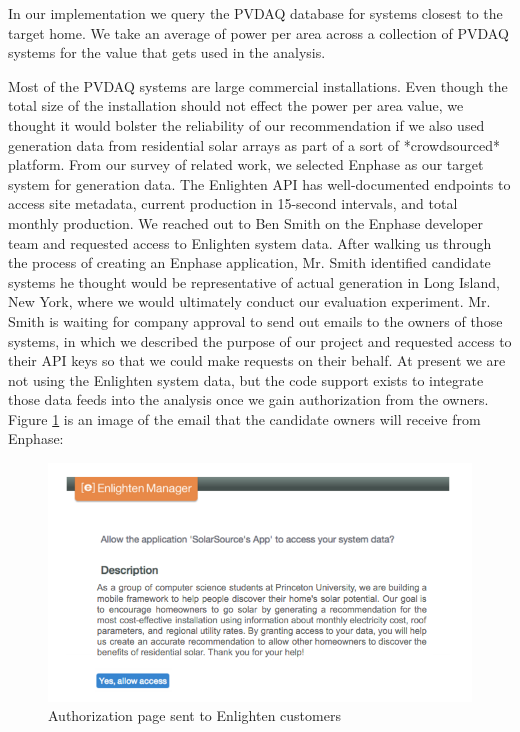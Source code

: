 \documentclass[pageno]{jpaper}
\begin{document}
In our implementation we query the PVDAQ database for systems closest to the target home. We take an average of power per area across a collection of PVDAQ systems for the value that gets used in the analysis.

Most of the PVDAQ systems are large commercial installations. Even though the total size of the installation should not effect the power per area value, we thought it would bolster the reliability of our recommendation if we also used generation data from residential solar arrays as part of a sort of *crowdsourced* platform. From our survey of related work, we selected Enphase as our target system for generation data. The Enlighten API has well-documented endpoints to access site metadata, current production in 15-second intervals, and total monthly production. We reached out to Ben Smith on the Enphase developer team and requested access to Enlighten system data. After walking us through the process of creating an Enphase application, Mr. Smith identified candidate systems he thought would be representative of actual generation in Long Island, New York, where we would ultimately conduct our evaluation experiment. Mr. Smith is waiting for company approval to send out emails to the owners of those systems, in which we described the purpose of our project and requested access to their API keys so that we could make requests on their behalf. At present we are not using the Enlighten system data, but the code support exists to integrate those data feeds into the analysis once we gain authorization from the owners. Figure \ref{fig:enphase} is an image of the email that the candidate owners will receive from Enphase:

\begin{figure}[h]
\begin{center}
\includegraphics[scale=0.4] {enphase-access}
\caption{Authorization page sent to Enlighten customers}
\label{fig:enphase}
\end{center}
\end{figure}
\end{document}
